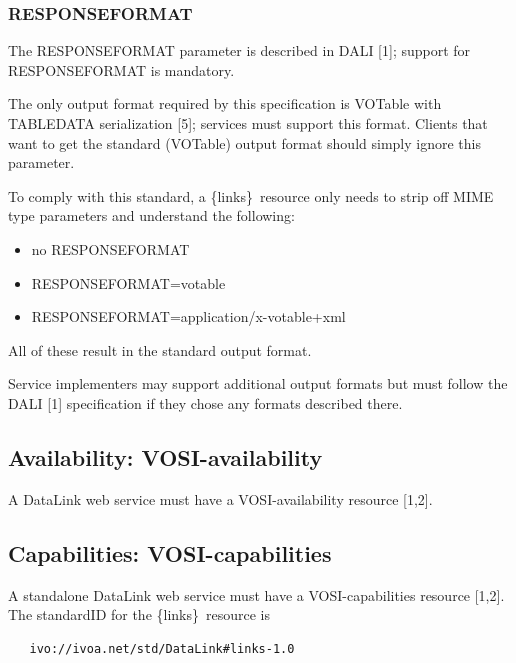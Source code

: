 \documentclass[11pt,a4paper]{ivoa}
\newcommand{\blinks}{\{links\}}
\begin{document}
\subsubsection{RESPONSEFORMAT}

The RESPONSEFORMAT parameter is described in DALI [1];
support for RESPONSEFORMAT is mandatory.

The only output format required by this specification is VOTable with
TABLEDATA serialization [5]; services must support this format. Clients
that want to get the standard (VOTable) output format should simply
ignore this parameter.

To comply with this standard, a \blinks\ resource only needs to strip
off MIME type parameters and understand the following:
\begin{itemize}
  \item no RESPONSEFORMAT
  \item RESPONSEFORMAT=votable
  \item RESPONSEFORMAT=application/x-votable+xml
\end{itemize}
All of these result in the standard output format.

Service implementers may support additional output formats but must follow
the DALI [1] specification if they chose any formats described there.


\subsection{Availability: VOSI-availability}

A DataLink web service must have a VOSI-availability resource [1,2].


\subsection{Capabilities: VOSI-capabilities}

A standalone DataLink web service must have a
VOSI-capabilities resource [1,2].
The standardID for the \blinks\ resource is
\begin{verbatim}
   ivo://ivoa.net/std/DataLink#links-1.0
\end{verbatim}
\end{document}
